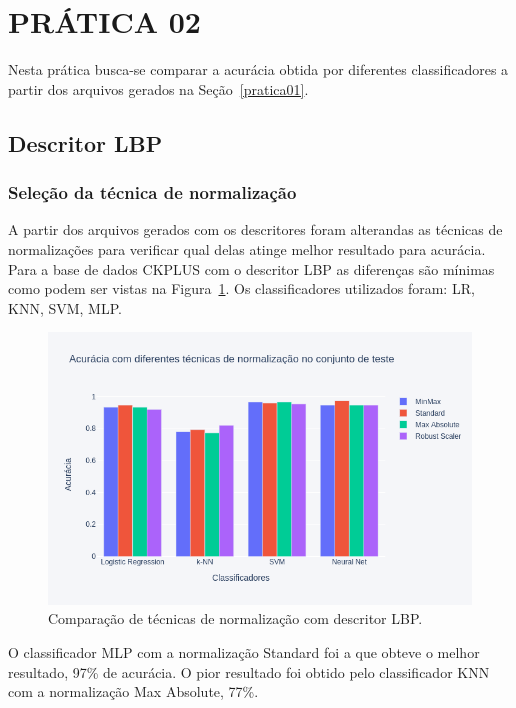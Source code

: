 \documentclass[a4paper, 12 pt, conference]{ieeeconf}  %
\begin{document}
\section{PRÁTICA 02}
\label{pratica02}
Nesta prática busca-se comparar a acurácia obtida por diferentes classificadores a partir dos arquivos gerados na Seção~\ref{pratica01}.

\subsection{Descritor LBP}
\subsubsection{Seleção da técnica de normalização}
A partir dos arquivos gerados com os descritores foram alterandas as técnicas de normalizações para verificar qual delas atinge melhor resultado para acurácia. Para a base de dados CKPLUS com o descritor LBP as diferenças são mínimas como podem ser vistas na Figura~\ref{fig:bar_norm_all_lbp}. Os classificadores utilizados foram: LR, KNN, SVM, MLP.

\begin{figure}[!htbp]
	\centering
	\includegraphics[width=1.0\linewidth,clip=true,trim=0cm 0cm 0cm 0cm, keepaspectratio=true]{bar_norm_all_lbp.png}
	\caption{Comparação de técnicas de normalização com descritor LBP.}
	\label{fig:bar_norm_all_lbp}
\end{figure}

O classificador MLP com a normalização Standard foi a que obteve o melhor resultado, 97\% de acurácia. O pior resultado foi obtido pelo classificador KNN com a normalização Max Absolute, 77\%.
\end{document}
